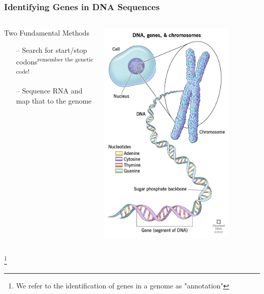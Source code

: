 \documentclass{beamer}
\newcommand\blfootnote[1]{%
	\begingroup
	\renewcommand\thefootnote{}\footnote{#1}%
	\addtocounter{footnote}{-1}%
	\endgroup
}
\begin{document}
\begin{frame}
	\frametitle{Identifying Genes in DNA Sequences}
		
	\begin{columns}
		\begin{column}{0.5\textwidth}
			
		Two Fundamental Methods
			\begin{itemize}
				\item[--] Search for start/stop codons\textsuperscript{remember the genetic code!}
				\item[--] Sequence RNA and map that to the genome
				\end{itemize}
		\end{column}
		\begin{column}{0.5\textwidth}
						\centering	\includegraphics[keepaspectratio, width  = 0.8\textwidth]{img/geneOnDNA}
		\end{column}
	\end{columns}
	
\blfootnote{We refer to the identification of genes in a genome as "annotation"}
\end{frame}
\end{document}
